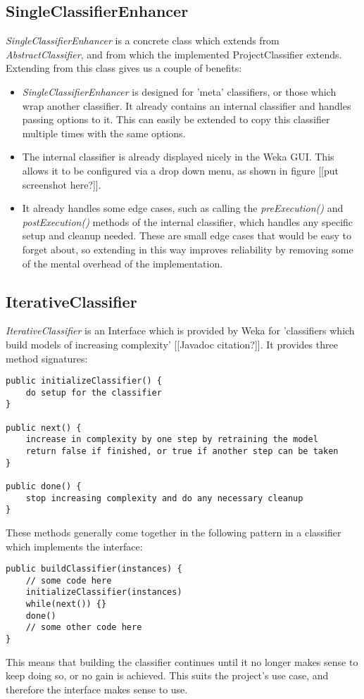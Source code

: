 \subsection{SingleClassifierEnhancer}
\textit{SingleClassifierEnhancer} is a concrete class which extends from \textit{AbstractClassifier}, and from which the implemented ProjectClassifier extends. Extending from this class gives us a couple of benefits:
\begin{itemize}
\item \textit{SingleClassifierEnhancer} is designed for 'meta' classifiers, or those which wrap another classifier. It already contains an internal classifier and handles passing options to it. This can easily be extended to copy this classifier multiple times with the same options.
\item The internal classifier is already displayed nicely in the Weka GUI. This allows it to be configured via a drop down menu, as shown in figure [[put screenshot here?]].
\item It already handles some edge cases, such as calling the \textit{preExecution()} and \textit{postExecution()} methods of the internal classifier, which handles any specific setup and cleanup needed. These are small edge cases that would be easy to forget about, so extending in this way improves reliability by removing some of the mental overhead of the implementation.
\end{itemize}

\subsection{IterativeClassifier}
\textit{IterativeClassifier} is an Interface which is provided by Weka for 'classifiers which build models of increasing complexity' [[Javadoc citation?]]. It provides three method signatures: 
\begin{footnotesize}
\begin{verbatim}
public initializeClassifier() {
    do setup for the classifier
}

public next() {
    increase in complexity by one step by retraining the model
    return false if finished, or true if another step can be taken
}

public done() {
    stop increasing complexity and do any necessary cleanup
}
\end{verbatim}
\end{footnotesize}
These methods generally come together in the following pattern in a classifier which implements the interface:
\begin{footnotesize}
\begin{verbatim}
public buildClassifier(instances) {
    // some code here 
    initializeClassifier(instances)
    while(next()) {}
    done()
    // some other code here
}
\end{verbatim}
\end{footnotesize}
This means that building the classifier continues until it no longer makes sense to keep doing so, or no gain is achieved. This suits the project's use case, and therefore the interface makes sense to use.

